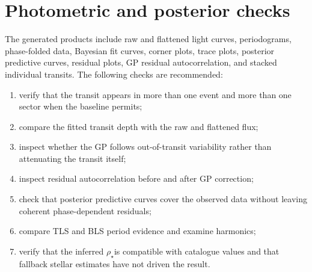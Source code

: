 \documentclass[12pt,a4paper,oneside]{report}
\newcommand{\rhoStar}{\ensuremath{\rho_{\star}}}
\begin{document}
\section{Photometric and posterior checks}
The generated products include raw and flattened light curves, periodograms,
phase-folded data, Bayesian fit curves, corner plots, trace plots, posterior
predictive curves, residual plots, GP residual autocorrelation, and stacked
individual transits. The following checks are recommended:
\begin{enumerate}
  \item verify that the transit appears in more than one event and more than one
        sector when the baseline permits;
  \item compare the fitted transit depth with the raw and flattened flux;
  \item inspect whether the GP follows out-of-transit variability rather than
        attenuating the transit itself;
  \item inspect residual autocorrelation before and after GP correction;
  \item check that posterior predictive curves cover the observed data without
        leaving coherent phase-dependent residuals;
  \item compare TLS and BLS period evidence and examine harmonics;
  \item verify that the inferred \rhoStar is compatible with catalogue values
        and that fallback stellar estimates have not driven the result.
\end{enumerate}
\end{document}
